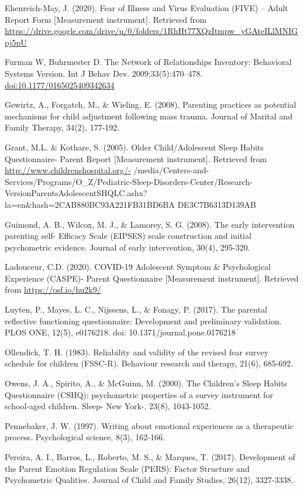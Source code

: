 \documentclass[]{book}
\begin{document}
Ehenreich-May, J. (2020). Fear of Illness and Virus Evaluation (FIVE) -- Adult Report Form
{[}Measurement instrument{]}. Retrieved from
\url{https://drive.google.com/drive/u/0/folders/1RhHt77XQzItmpw_yGAteILlMNIGpj5pU}

Furman W, Buhrmester D. The Network of Relationships Inventory: Behavioral Systems
Version. Int J Behav Dev. 2009;33(5):470--478. \url{doi:10.1177/0165025409342634}

Gewirtz, A., Forgatch, M., \& Wieling, E. (2008). Parenting practices as potential mechanisms for
child adjustment following mass trauma. Journal of Marital and Family Therapy, 34(2),
177-192.

Grant, M.L. \& Kothare, S. (2005). Older Child/Adolescent Sleep Habits Questionnaire- Parent
Report {[}Measurement instrument{]}. Retrieved from \url{http://www.childrenshospital.org/-}
/media/Centers-and-Services/Programs/O\_Z/Pediatric-Sleep-Disorders-Center/Research-
VersionParentsAdolescentSHQLC.ashx?la=en\&hash=2CAB880BC93A221FB31BD6BA
DE3C7B6313D139AB

Guimond, A. B., Wilcox, M. J., \& Lamorey, S. G. (2008). The early intervention parenting self-
Efficacy Scale (EIPSES) scale construction and initial psychometric evidence. Journal of
early intervention, 30(4), 295-320.

Ladouceur, C.D. (2020). COVID-19 Adolescent Symptom \& Psychological Experience (CASPE)-
Parent Questionnaire {[}Measurement instrument{]}. Retrieved from \url{https://osf.io/hu2k9/}

Luyten, P., Mayes, L. C., Nijssens, L., \& Fonagy, P. (2017). The parental reflective functioning
questionnaire: Development and preliminary validation. PLOS ONE, 12(5), e0176218.
doi: 10.1371/journal.pone.0176218

Ollendick, T. H. (1983). Reliability and validity of the revised fear survey schedule for children
(FSSC-R). Behaviour research and therapy, 21(6), 685-692.

Owens, J. A., Spirito, A., \& McGuinn, M. (2000). The Children's Sleep Habits Questionnaire
(CSHQ): psychometric properties of a survey instrument for school-aged children. Sleep-
New York-, 23(8), 1043-1052.

Pennebaker, J. W. (1997). Writing about emotional experiences as a therapeutic
process. Psychological science, 8(3), 162-166.

Pereira, A. I., Barros, L., Roberto, M. S., \& Marques, T. (2017). Development of the Parent
Emotion Regulation Scale (PERS): Factor Structure and Psychometric Qualities. Journal
of Child and Family Studies, 26(12), 3327-3338.
\end{document}
